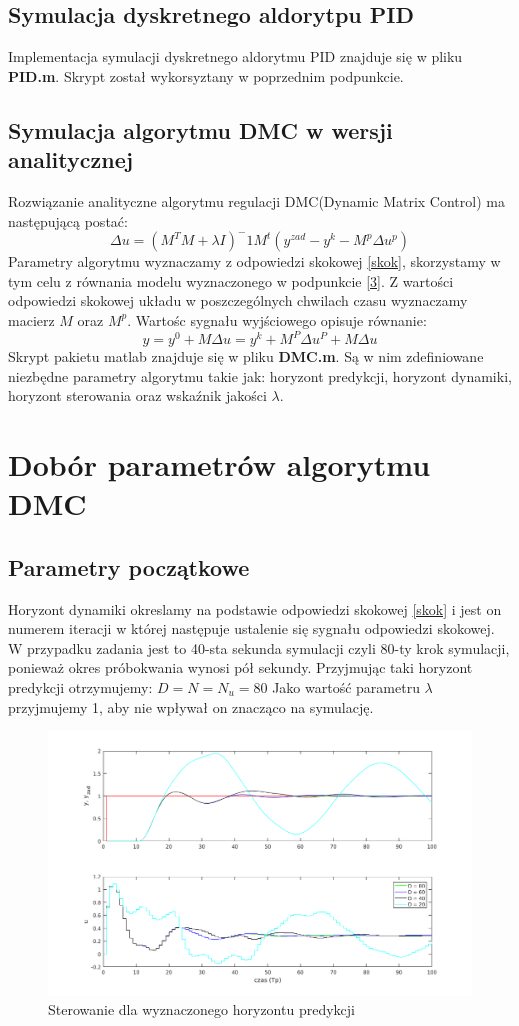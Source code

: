 \documentclass[a4paper, 11pt]{article}
\begin{document}
\subsection{Symulacja dyskretnego aldorytpu PID}
Implementacja symulacji dyskretnego aldorytmu PID znajduje się w pliku \textbf{PID.m}. Skrypt został wykorsyztany w poprzednim podpunkcie. 
\subsection{Symulacja algorytmu DMC w wersji analitycznej}
 Rozwiązanie analityczne algorytmu regulacji DMC(Dynamic Matrix Control) ma następującą postać: 
 $$\Delta u = (M^TM+\lambda I)^-1M^t(y^{zad}-y^k-M^p\Delta u^p) $$
Parametry algorytmu wyznaczamy z odpowiedzi skokowej \ref{skok}, skorzystamy w tym celu z równania modelu wyznaczonego w podpunkcie \ref{3}. Z wartości odpowiedzi skokowej układu w poszczególnych chwilach czasu wyznaczamy macierz $M$ oraz $M^p$. Wartośc sygnału wyjściowego opisuje równanie: 
$$y = y^0 + M\Delta u = y^k +M^P \Delta u^P + M\Delta u$$
Skrypt pakietu matlab znajduje się w pliku \textbf{DMC.m}. Są w nim zdefiniowane niezbędne parametry algorytmu takie jak: horyzont predykcji, horyzont dynamiki, horyzont sterowania oraz wskaźnik jakości $\lambda$. 
\section{Dobór parametrów algorytmu DMC}
\subsection{Parametry początkowe}
Horyzont dynamiki okreslamy na podstawie odpowiedzi skokowej \ref{skok} i jest on numerem iteracji w której następuje ustalenie się sygnału odpowiedzi skokowej. W przypadku zadania jest to 40-sta sekunda symulacji czyli 80-ty krok symulacji, ponieważ okres próbokwania wynosi pół sekundy. Przyjmując taki horyzont predykcji otrzymujemy: 
$D = N = N_u = 80$
Jako wartość parametru $\lambda$ przyjmujemy 1, aby nie wpływał on znacząco na symulację. 
\begin{figure}[H]
\centering
\includegraphics[scale=0.60]{horyzont_predykcji_dmc.png}
\caption{Sterowanie dla wyznaczonego horyzontu predykcji}
\label{}
\end{figure}
\end{document}
